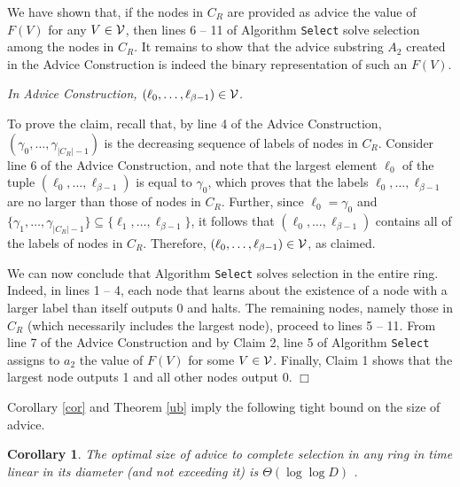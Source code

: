 \documentclass[11pt]{article}
\newtheorem{corollary}{Corollary}[section]
\newcommand{\qed}{\hfill $\Box$ \bigbreak}
\newenvironment{proof}{\noindent {\bf Proof.}}{\qed}
\newcommand{\candidates}[1]{\ensuremath{C_{#1}}}
\newcommand{\maxcandidates}{\ensuremath{\beta}}
\begin{document}
\begin{proof}
We have shown that, if the nodes in $\candidates{R}$ are provided as advice the value of $F(V)$ for any $V \in {\cal V}$, then lines 6 -- 11 of Algorithm {\tt Select} solve selection among the nodes in $\candidates{R}$. It remains to show that the advice substring $A_2$ created in the Advice Construction is indeed the binary representation of such an $F(V)$.

\vspace{3mm} 
\textit{In Advice Construction, $(\ell_0,\ldots,\ell_{\beta-1}) \in {\cal V}$.}
\vspace{3mm}

To prove the claim, recall that, by line 4 of the Advice Construction, $(\gamma_0,\ldots,\gamma_{|\candidates{R}|-1})$ is the decreasing sequence of labels of nodes in $\candidates{R}$. Consider line 6 of the Advice Construction, and note that the largest element $\ell_0$ of the tuple $(\ell_0,\ldots,\ell_{\beta-1})$ is equal to $\gamma_0$, which proves that the labels $\ell_0,\ldots,\ell_{\beta-1}$ are no larger than those of nodes in $\candidates{R}$. Further, since $\ell_0 = \gamma_0$ and $\{\gamma_1,\ldots,\gamma_{|\candidates{R}|-1}\} \subseteq \{\ell_1,\ldots,\ell_{\maxcandidates-1}\}$, it follows that $(\ell_0,\ldots,\ell_{\beta-1})$ contains all of the labels of nodes in $C_R$. Therefore, $(\ell_0,\ldots,\ell_{\beta-1}) \in {\cal V}$, as claimed.

We can now conclude that Algorithm {\tt Select} solves selection in the entire ring. Indeed, in lines 1 -- 4, each node that learns about the existence of a node with a larger label than itself outputs 0 and halts. The remaining nodes, namely those in $\candidates{R}$ (which necessarily includes the largest node), proceed to lines 5 -- 11. From line 7 of the Advice Construction and by Claim 2, line 5 of Algorithm {\tt Select} assigns to $a_2$ the value of $F(V)$ for some $V \in {\cal V}$. Finally, Claim 1 shows that the largest node outputs 1 and all other nodes output 0.
\end{proof}

Corollary \ref{cor} and Theorem \ref{ub} imply the following tight bound on the size of advice.

\begin{corollary}
The optimal size of advice to complete selection in any ring in time linear in its diameter (and not exceeding it) is $\Theta(\log \log D)$ .
\end{corollary} 
\end{document}
